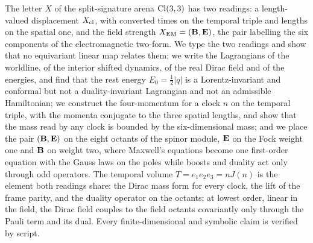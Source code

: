 The letter $X$ of the split-signature arena $\mathrm{Cl}(3,3)$ has two readings: a length-valued displacement $X_{\rm cl}$, with converted times
on the temporal triple and lengths on the spatial one, and the field strength $X_{\rm EM}=(\mathbf B,\mathbf E)$, the pair labelling the six components
of the electromagnetic two-form. We type the two readings and show that no equivariant linear map relates them; we write the Lagrangians
of the worldline, of the interior shifted dynamics, of the real Dirac field and of the energies, and find that the rest energy
$E_0=\tfrac12|q|$ is a Lorentz-invariant and conformal but not a duality-invariant Lagrangian and not an admissible Hamiltonian; we construct
the four-momentum for a clock $n$ on the temporal triple, with the momenta conjugate to the three spatial lengths, and show that the mass
read by any clock is bounded by the six-dimensional mass; and we place the pair $(\mathbf B,\mathbf E)$ on the eight octants of the spinor module,
$\mathbf E$ on the Fock weight one and $\mathbf B$ on weight two, where Maxwell's equations become one first-order equation with the Gauss laws on the
poles while boosts and duality act only through odd operators. The temporal volume $T=e_1e_2e_3=nJ(n)$ is the element both readings share:
the Dirac mass form for every clock, the lift of the frame parity, and the duality operator on the octants; at lowest order, linear in the field, the Dirac
field couples to the field octants covariantly only through the Pauli term and its dual. Every finite-dimensional and symbolic claim is verified by script.
